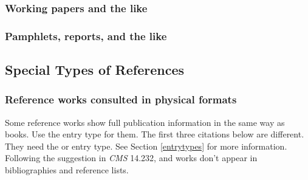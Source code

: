 \documentclass[11pt,letterpaper,oneside]{article}
\begin{document}
\begin{citebib}
\item \cite{hong2015}
\end{citebib}

\subsubsection{Working papers and the like}

\begin{citebib}
\item \cite{lucki1980}
\end{citebib}

\setcounter{subsubsection}{219}
\subsubsection{Pamphlets, reports, and the like}

\begin{citebib}
\item \cite{lifestyles1996}
\item \cite{mcdonalds2014}
\item \cite[¶2,620]{standardtax1996}
\end{citebib}

\setcounter{subsection}{8}
\subsection{Special Types of References}
\setcounter{subsection}{14}

\setcounter{subsubsection}{231}
\subsubsection{Reference works consulted in physical formats}
\label{14.232}

Some reference works show full publication information in the same way
as books. Use the  entry type for them. The first three
citations below are different. They need the  or
 entry type. See Section \ref{entrytypes} for
more information. Following the suggestion in \textit{CMS} 14.232,
 and  works don't appear in
bibliographies and reference lists.

\begin{citebib}
\item \cite{salvation1980}
\item \cite{hootananny2009}
\item \cite{dab1937}
\item \cite[s.vv. \mkbibquote{police ranks}, \mkbibquote{postal addresses}]{timestyle2003}
\item \cite[6.8.2]{mla2008}
\end{citebib}
\end{document}
